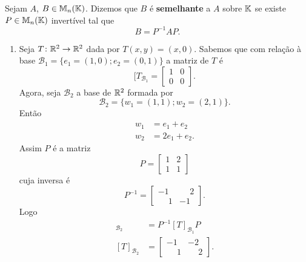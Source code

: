 \begin{definicao}
  Sejam $A$, $B \in \mathbb{M}_n(\mathbb{K})$. Dizemos que $B$ é \textbf{semelhante} a $A$ sobre $\mathbb{K}$ se existe $P \in \mathbb{M}_n(\mathbb{K})$ invertível tal que
  \[
    B = P^{-1}AP.
  \]
\end{definicao}

\begin{exemplos}
  \begin{enumerate}[label={\arabic*})]
    \item Seja $T \colon \mathbb{R}^2 \to \mathbb{R}^2$ dada por $T(x,y) = (x,0)$. Sabemos que com relação \`a base $\mathcal{B}_1 = \{e_1=(1,0);e_2=(0,1)\}$ a matriz de $T$ é
    \[
      [T_{\mathcal{B}_1} = \begin{bmatrix}
        1 & 0\\
        0 & 0
      \end{bmatrix}.
    \]
    Agora, seja $\mathcal{B}_2$ a base de $\mathbb{R}^2$ formada por
    \[
      \mathcal{B}_2 = \{w_1 = (1,1);w_2=(2,1)\}.
    \]
    Então
    \begin{align*}
      w_1 &= e_1 + e_2\\
      w_2 &= 2e_1 + e_2.
    \end{align*}
    Assim $P$ é a matriz
    \[
      P = \begin{bmatrix}
        1 & 2\\
        1 & 1
      \end{bmatrix}
    \]
    cuja inversa é
    \[
      P^{-1} = \begin{bmatrix}
        -1 & \phantom{-}2\\
        \phantom{-}1 & -1
      \end{bmatrix}.
    \]
    Logo
    \begin{align*}
      [T]_{\mathcal{B}_2} &= P^{-1}[T]_{\mathcal{B}_1}P\\
      [T]_{\mathcal{B}_2} &= \begin{bmatrix}
        -1 & -2\\
        \phantom{-}1 & \phantom{-}2
      \end{bmatrix}.
    \end{align*}


\end{enumerate}
\end{exemplos}
